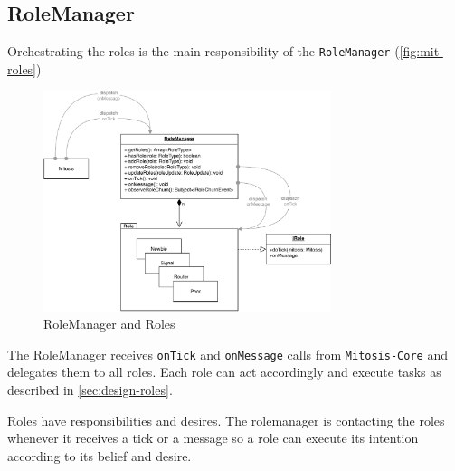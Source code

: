 \subsection{RoleManager}\label{sec:mit-roleManager}
Orchestrating the roles is the main responsibility of the \lstinline|RoleManager| (\vref{fig:mit-roles})

\begin{figure}
\centering
\includegraphics[width=0.75\textwidth]{graphics/implementation/mitosis-architecture-roles.pdf}
\caption{RoleManager and Roles}
\label{fig:mit-roles}
\end{figure}

The RoleManager receives \lstinline|onTick| and \lstinline|onMessage| calls from \lstinline|Mitosis-Core| and delegates them to all roles. Each role can act accordingly and execute tasks as described in \vref{sec:design-roles}.

Roles have responsibilities and desires. The rolemanager is contacting the roles whenever it receives a tick or a message so a role can execute its intention according to its belief and desire.